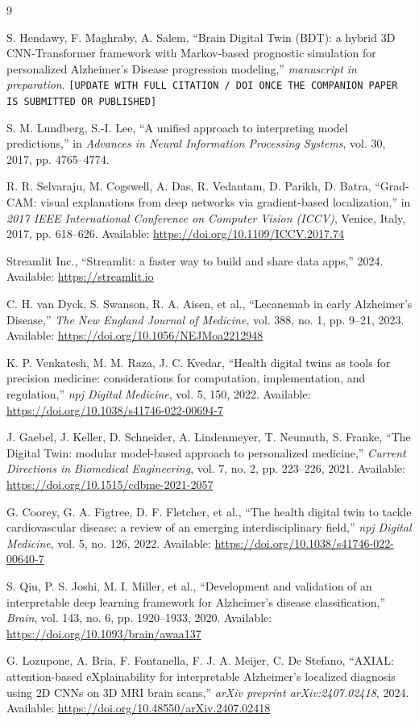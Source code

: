 \documentclass[5p,times,twocolumn]{elsarticle}
\begin{document}
\begin{thebibliography}{9}

 S. Hendawy, F. Maghraby, A. Salem, ``Brain Digital Twin (BDT): a hybrid 3D CNN-Transformer framework with Markov-based prognostic simulation for personalized Alzheimer's Disease progression modeling,'' \textit{manuscript in preparation}. \texttt{[UPDATE WITH FULL CITATION / DOI ONCE THE COMPANION PAPER IS SUBMITTED OR PUBLISHED]}

 S. M. Lundberg, S.-I. Lee, ``A unified approach to interpreting model predictions,'' in \textit{Advances in Neural Information Processing Systems}, vol. 30, 2017, pp. 4765--4774.

 R. R. Selvaraju, M. Cogswell, A. Das, R. Vedantam, D. Parikh, D. Batra, ``Grad-CAM: visual explanations from deep networks via gradient-based localization,'' in \textit{2017 IEEE International Conference on Computer Vision (ICCV)}, Venice, Italy, 2017, pp. 618--626. Available: \url{https://doi.org/10.1109/ICCV.2017.74}

 Streamlit Inc., ``Streamlit: a faster way to build and share data apps,'' 2024. Available: \url{https://streamlit.io}

 C. H. van Dyck, S. Swanson, R. A. Aisen, et al., ``Lecanemab in early Alzheimer's Disease,'' \textit{The New England Journal of Medicine}, vol. 388, no. 1, pp. 9--21, 2023. Available: \url{https://doi.org/10.1056/NEJMoa2212948}

 K. P. Venkatesh, M. M. Raza, J. C. Kvedar, ``Health digital twins as tools for precision medicine: considerations for computation, implementation, and regulation,'' \textit{npj Digital Medicine}, vol. 5, 150, 2022. Available: \url{https://doi.org/10.1038/s41746-022-00694-7}

 J. Gaebel, J. Keller, D. Schneider, A. Lindenmeyer, T. Neumuth, S. Franke, ``The Digital Twin: modular model-based approach to personalized medicine,'' \textit{Current Directions in Biomedical Engineering}, vol. 7, no. 2, pp. 223--226, 2021. Available: \url{https://doi.org/10.1515/cdbme-2021-2057}

 G. Coorey, G. A. Figtree, D. F. Fletcher, et al., ``The health digital twin to tackle cardiovascular disease: a review of an emerging interdisciplinary field,'' \textit{npj Digital Medicine}, vol. 5, no. 126, 2022. Available: \url{https://doi.org/10.1038/s41746-022-00640-7}

 S. Qiu, P. S. Joshi, M. I. Miller, et al., ``Development and validation of an interpretable deep learning framework for Alzheimer's disease classification,'' \textit{Brain}, vol. 143, no. 6, pp. 1920--1933, 2020. Available: \url{https://doi.org/10.1093/brain/awaa137}

 G. Lozupone, A. Bria, F. Fontanella, F. J. A. Meijer, C. De Stefano, ``AXIAL: attention-based eXplainability for interpretable Alzheimer's localized diagnosis using 2D CNNs on 3D MRI brain scans,'' \textit{arXiv preprint arXiv:2407.02418}, 2024. Available: \url{https://doi.org/10.48550/arXiv.2407.02418}

\end{thebibliography}
\end{document}
